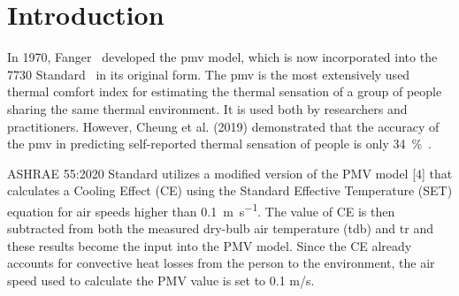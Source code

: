 

\section{Introduction}\label{sec:introduction}

    In 1970, Fanger~\cite{Fanger1970} developed the \ac{pmv} model, which is now incorporated into the \gls{7730} Standard~\cite{iso7730} in its original form.
    The \ac{pmv} is the most extensively used thermal comfort index for estimating the thermal sensation of a group of people sharing the same thermal environment.
    It is used both by researchers and practitioners.
    However, Cheung et al. (2019) demonstrated that the accuracy of the \ac{pmv} in predicting self-reported thermal sensation of people is only \qty{34}{\percent}~\cite{Cheung2019}.

    ASHRAE 55:2020 Standard utilizes a modified version of the PMV model [4] that calculates a Cooling Effect (CE) using the Standard Effective Temperature (SET) equation for air speeds higher than \qty{0.1}{\m\per\s}.
    The value of CE is then subtracted from both the measured dry-bulb air temperature (tdb) and \ac{tr} and these results become the input into the PMV model.
    Since the CE already accounts for convective heat losses from the person to the environment, the air speed used to calculate the PMV value is set to 0.1 m/s.


